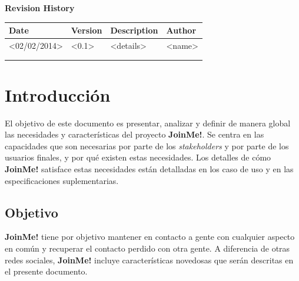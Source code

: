 \documentclass[12pt, a4paper, titlepage]{article}
\begin{document}
\begin{titlepage}
\vspace{2cm}
\begin{center}
	\large{\textbf{Revision History}}
	
    \begin{tabular}{ | p{4cm} | p{2cm} | p{5cm} | p{4cm} |}
    \hline
    \textbf{Date} & \textbf{Version} & \textbf{Description} & \textbf{Author} \\ \hline
    \textless 02/02/2014\textgreater & \textless 0.1\textgreater & \textless details\textgreater & \textless name\textgreater  \\ \hline
    & & & \\ \hline
    & & & \\ \hline
    \end{tabular}
\end{center}

\end{titlepage}
\clearpage


\tableofcontents
\newpage

\section{Introducción}

El objetivo de este documento es presentar, analizar y definir de manera global las necesidades y características del proyecto \textbf{JoinMe!}. Se centra en las capacidades que son necesarias por parte de los \textit{stakeholders} y por parte de los usuarios finales, y por qué existen estas necesidades. Los detalles de cómo \textbf{JoinMe!} satisface estas necesidades están detalladas en los caso de uso y en las especificaciones suplementarias.


\subsection{Objetivo}

\textbf{JoinMe!} tiene por objetivo mantener en contacto a gente con cualquier aspecto en común y recuperar el contacto perdido con otra gente. A diferencia de otras redes sociales, \textbf{JoinMe!} incluye características novedosas que serán descritas en el presente documento.
\end{document}
